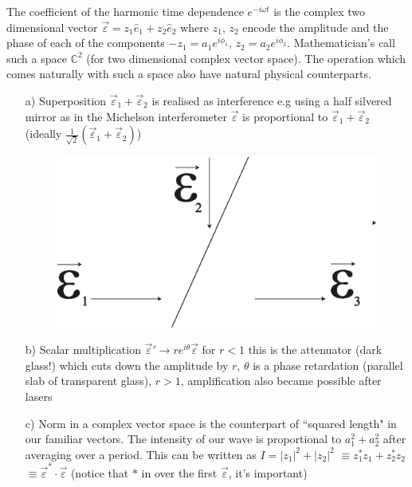 The coefficient of the harmonic time dependence $e^{-i \omega t}$ is the complex two dimensional vector
$\overrightarrow{\varepsilon} = z_1 \hat{e}_1 + z_2 \hat{e}_2$ where $z_1$, $z_2$ encode the amplitude and the phase of each of
the components $- z_1 = a_1 e^{i \phi_1}$, $z_2 = a_2 e^{i\phi_2}$. Mathematician's call such a space
$\mathbb{C}^2$ (for two dimensional complex vector space). The operation which comes
naturally with such a space also have natural physical counterparts.
\begin{itemize}
\item[a)] Superposition $\overrightarrow{\varepsilon}_1 + \overrightarrow{\varepsilon}_2$ is realised as interference e.g using a half silvered
mirror as in the Michelson interferometer $\overrightarrow{\varepsilon}$ is proportional to $\overrightarrow{\varepsilon}_1 + \overrightarrow{\varepsilon}_2$ (ideally
$\frac{1}{\sqrt{2}} (\overrightarrow{\varepsilon}_1 + \overrightarrow{\varepsilon}_2)$)
\begin{figure}[H]
\centering
\includegraphics[scale=0.15]{src/images/chap26/1.jpg}
\end{figure}

\item[b)] Scalar multiplication $\overrightarrow{\varepsilon}' \to re^{i\theta} \overrightarrow{\varepsilon}$ for $r < 1$ this is the attenuator (dark
glass!) which cuts down the amplitude by $r$, $\theta$ is a phase retardation (parallel slab of transparent glass), $r > 1$, amplification also became possible after lasers


\item[c)] Norm in a complex vector space is the counterpart of ``squared length" in
our familiar vectors. The intensity of our wave is proportional to $a_1^2 + a_2^2$ after
averaging over a period. This can be written as $I = | z_1 |^2 + | z_2 |^2$ $\equiv z^{\ast}_1 z_1 + z^{\ast}_2 z_2$ $\equiv \overrightarrow{\varepsilon}^{\ast} \cdot \overrightarrow{\varepsilon}$ (notice that $\ast$ in over the first $\overrightarrow{\varepsilon}$, it's important)


\end{itemize}
